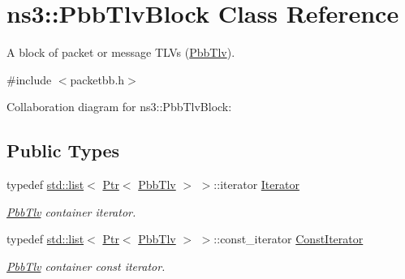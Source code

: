 \hypertarget{classns3_1_1PbbTlvBlock}{}\section{ns3\+:\+:Pbb\+Tlv\+Block Class Reference}
\label{classns3_1_1PbbTlvBlock}


A block of packet or message T\+L\+Vs (\hyperlink{classns3_1_1PbbTlv}{Pbb\+Tlv}).  




{\ttfamily \#include $<$packetbb.\+h$>$}



Collaboration diagram for ns3\+:\+:Pbb\+Tlv\+Block\+:
\subsection*{Public Types}
\begin{DoxyCompactItemize}
\item 
typedef \hyperlink{openflow-interface_8h_afd9bcfa176617760671b67580f536fa7}{std\+::list}$<$ \hyperlink{classns3_1_1Ptr}{Ptr}$<$ \hyperlink{classns3_1_1PbbTlv}{Pbb\+Tlv} $>$ $>$\+::iterator \hyperlink{classns3_1_1PbbTlvBlock_a50ca1859c6f7425f0c9e2fcb11ded31d}{Iterator}
\begin{DoxyCompactList}\small\item\em \hyperlink{classns3_1_1PbbTlv}{Pbb\+Tlv} container iterator. \end{DoxyCompactList}\item 
typedef \hyperlink{openflow-interface_8h_afd9bcfa176617760671b67580f536fa7}{std\+::list}$<$ \hyperlink{classns3_1_1Ptr}{Ptr}$<$ \hyperlink{classns3_1_1PbbTlv}{Pbb\+Tlv} $>$ $>$\+::const\+\_\+iterator \hyperlink{classns3_1_1PbbTlvBlock_a069f89bd3bb058e9fa72ea464854c01f}{Const\+Iterator}
\begin{DoxyCompactList}\small\item\em \hyperlink{classns3_1_1PbbTlv}{Pbb\+Tlv} container const iterator. \end{DoxyCompactList}\end{DoxyCompactItemize}
